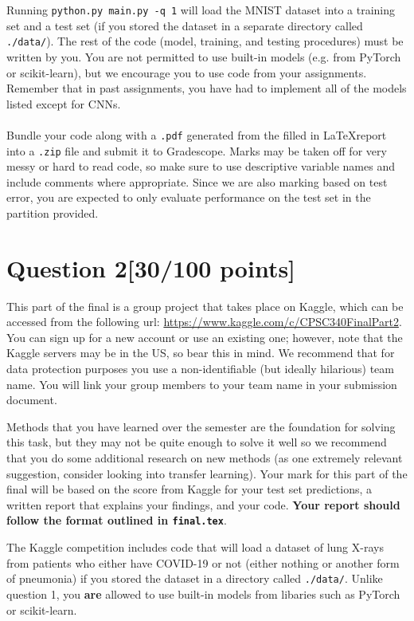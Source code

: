 \documentclass{article}
\begin{document}
\medskip
Running \texttt{python.py main.py -q 1} will load the MNIST dataset into a training set and a test set (if you stored the dataset in a separate directory called \texttt{./data/}). The rest of the code (model, training, and testing procedures) must be written by you. You are not permitted to use built-in models (e.g. from PyTorch or scikit-learn), but we encourage you to use code from your assignments. Remember that in past assignments, you have had to implement all of the models listed except for CNNs.\\
\\
Bundle your code along with a \texttt{.pdf} generated from the filled in \LaTeX  report into a \texttt{.zip} file and submit it to Gradescope. Marks may be taken off for very messy or hard to read code, so make sure to use descriptive variable names and include comments where appropriate. Since we are also marking based on test error, you are expected to only evaluate performance on the test set in the partition provided.


\section*{Question 2\hspace{10cm}[30/100 points]}
This part of the final is a group project that takes place on Kaggle, which can be accessed from the following url: \url{https://www.kaggle.com/c/CPSC340FinalPart2}. You can sign up for a new account or use an existing one; however, note that the Kaggle servers may be in the US, so bear this in mind.  We recommend that for data protection purposes you use a non-identifiable (but ideally hilarious) team name.  You will link your group members to your team name in your submission document.

Methods that you have learned over the semester are the foundation for solving this task, but they may not be quite enough to solve it well so we recommend that you  do some additional research on new methods (as one extremely relevant suggestion, consider looking into transfer learning). Your mark for this part of the final will be based on the score from Kaggle for your test set predictions, a written report that explains your findings, and your code. \textbf{Your report should follow the format outlined in \texttt{final.tex}}.

The Kaggle competition includes code that will load a dataset of lung X-rays from patients who either have COVID-19 or not (either nothing or another form of pneumonia) if you stored the dataset in a directory called \texttt{./data/}. Unlike question 1, you \textbf{are} allowed to use built-in models from libaries such as PyTorch or scikit-learn.
\end{document}
